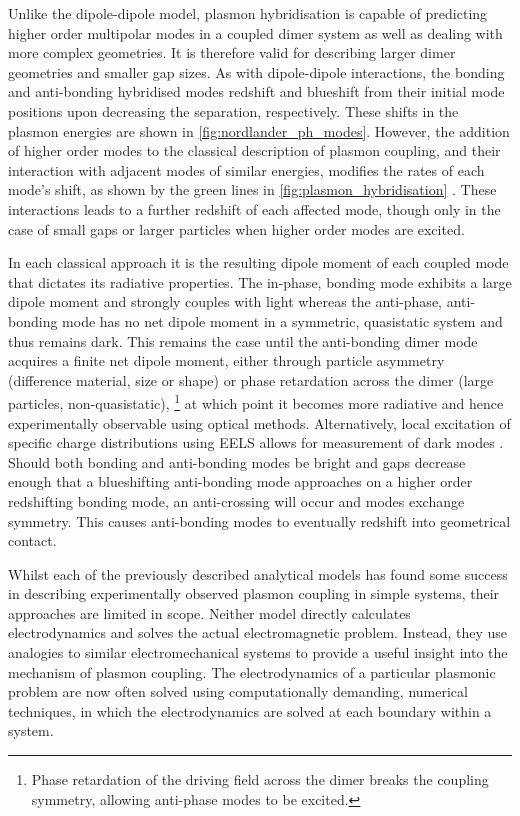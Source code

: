 \documentclass{article}
\begin{document}
Unlike the dipole-dipole model, plasmon hybridisation is capable of predicting higher order multipolar modes in a coupled dimer system as well as dealing with more complex geometries. It is therefore valid for describing larger dimer geometries and smaller gap sizes. As with dipole-dipole interactions, the bonding and anti-bonding hybridised modes redshift and blueshift from their initial mode positions upon decreasing the separation, respectively. These shifts in the plasmon energies are shown in \autoref{fig:nordlander_ph_modes}. However, the addition of higher order modes to the classical description of plasmon coupling, and their interaction with adjacent modes of similar energies, modifies the rates of each mode's shift, as shown by the green lines in \autoref{fig:plasmon_hybridisation} \cite{nordlander2004}. These interactions leads to a further redshift of each affected mode, though only in the case of small gaps or larger particles when higher order modes are excited.

In each classical approach it is the resulting dipole moment of each coupled mode that dictates its radiative properties. The in-phase, bonding mode exhibits a large dipole moment and strongly couples with light whereas the anti-phase, anti-bonding mode has no net dipole moment in a symmetric, quasistatic system and thus remains dark. This remains the case until the anti-bonding dimer mode acquires a finite net dipole moment, either through particle asymmetry (difference material, size or shape) or phase retardation across the dimer (large particles, non-quasistatic),%
\footnote{Phase retardation of the driving field across the dimer breaks the coupling symmetry, allowing anti-phase modes to be excited.}%
at which point it becomes more radiative and hence experimentally observable using optical methods. Alternatively, local excitation of specific charge distributions using EELS allows for measurement of dark modes \cite{chu2008, koh2009}. Should both bonding and anti-bonding modes be bright and gaps decrease enough that a blueshifting anti-bonding mode approaches on a higher order redshifting bonding mode, an anti-crossing will occur and modes exchange symmetry. This causes anti-bonding modes to eventually redshift into geometrical contact.

Whilst each of the previously described analytical models has found some success in describing experimentally observed plasmon coupling in simple systems, their approaches are limited in scope. Neither model directly calculates electrodynamics and solves the actual electromagnetic problem. Instead, they use analogies to similar electromechanical systems to provide a useful insight into the mechanism of plasmon coupling. The electrodynamics of a particular plasmonic problem are now often solved using computationally demanding, numerical techniques, in which the electrodynamics are solved at each boundary within a system.
\end{document}
